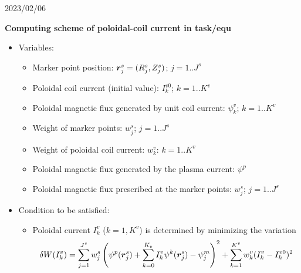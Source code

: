\documentclass[11pt]{article}
\begin{document}
\begin{flushright}
2023/02/06
\end{flushright}

\begin{center}
\textbf{\Large Computing scheme of poloidal-coil current in task/equ}
\end{center}

\begin{itemize}
\item
  Variables:
  \begin{itemize}
  \item
    Marker point position: $\vr_j^s = (R_j^s, Z_j^s)$; $j=1..J^s$
  \item
    Poloidal coil current (initial value): $I_k^{v0}$; $k=1..K^v$
  \item
    Poloidal magnetic flux generated by unit coil current: $\psi_k^v$;
    $k=1..K^v$
  \item
    Weight of marker points: $w_j^s$; $j=1..J^s$
  \item
    Weight of poloidal coil current: $w_k^v$: $k=1..K^v$
  \item
    Poloidal magnetic flux generated by the plasma current: $\psi^p$
  \item
    Poloidal magnetic flux prescribed at the marker points: $w_j^s$; $j=1..J^s$
  \end{itemize}
   
\item
  Condition to be satisfied:
  \begin{itemize}
  \item
    Poloidal current $I_k^v$ ($k=1,K^v$) is determined by minimizing
    the variation
    \[
    \delta W(I_k^v) = \sum_{j=1}^{J^s} w_j^s
    \left(\psi^p(\vr_j^s)+\sum_{k=0}^{K_v} I_k^v \psi^k(\vr_j^s)
    -\psi_j^m\right)^2
    +\sum_{k=1}^{K^v} w_k^v(I_k^v-I_k^{v0})^2
    \]
  \end{itemize}


\end{itemize}
\end{document}
